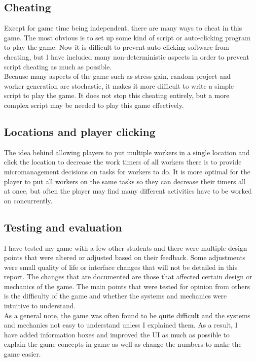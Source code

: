 \documentclass[11pt]{article}
\newcommand{\n}[0]{\\[\baselineskip]}
\begin{document}
\subsection{Cheating}
Except for game time being independent, there are many ways to cheat in this game. The most obvious is to set up some kind of script or auto-clicking program to play the game. Now it is difficult to prevent auto-clicking software from cheating, but I have included many non-deterministic aspects in order to prevent script cheating as much as possible. 
\n
Because many aspects of the game such as stress gain, random project and worker generation are stochastic, it makes it more difficult to write a simple script to play the game. It does not stop this cheating entirely, but a more complex script may be needed to play this game effectively.

\subsection{Locations and player clicking}
The idea behind allowing players to put multiple workers in a single location and click the location to decrease the work timers of all workers there is to provide micromanagement decisions on tasks for workers to do. It is more optimal for the player to put all workers on the same tasks so they can decrease their timers all at once, but often the player may find many different activities have to be worked on concurrently. 

\subsection{Testing and evaluation}
I have tested my game with a few other students and there were multiple design points that were altered or adjusted based on their feedback. Some adjustments were small quality of life or interface changes that will not be detailed in this report. The changes that are documented are those that affected certain design or mechanics of the game. The main points that were tested for opinion from others is the difficulty of the game and whether the systems and mechanics were intuitive to understand. 
\n
As a general note, the game was often found to be quite difficult and the systems and mechanics not easy to understand unless I explained them. As a result, I have added information boxes and improved the UI as much as possible to explain the game concepts in game as well as change the numbers to make the game easier.
\end{document}
